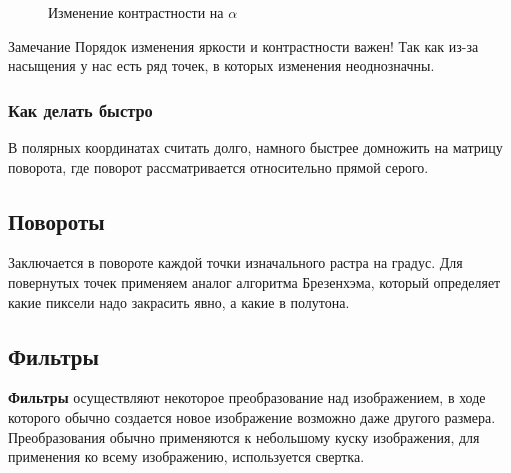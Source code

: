\begin{figure}[h!]
    \centering
    \caption{Изменение контрастности на $\alpha$}
    \label{fig:kontr}
\end{figure}

\begin{callout}{Замечание}
    Порядок изменения яркости и контрастности важен!
    Так как из-за насыщения у нас есть ряд точек, в которых изменения неоднозначны.
\end{callout}

\subsubsection{Как делать быстро}

В полярных координатах считать долго, намного быстрее домножить на матрицу поворота, где поворот рассматривается относительно прямой серого.

\subsection{Повороты}
Заключается в повороте каждой точки изначального растра на градус. Для повернутых точек применяем аналог алгоритма Брезенхэма, который определяет какие пиксели надо закрасить явно, а какие в полутона.

\subsection{Фильтры}
\textbf{Фильтры} осуществляют некоторое преобразование над изображением, в ходе которого обычно создается новое изображение возможно даже другого размера. Преобразования обычно применяются к небольшому куску изображения, для применения ко всему изображению, используется свертка.

